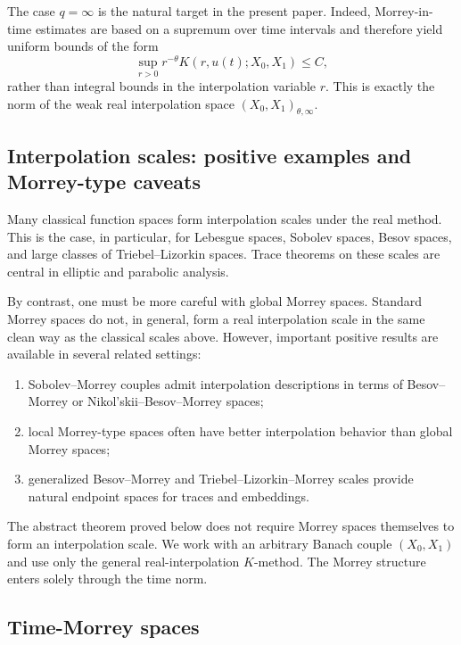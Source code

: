 \documentclass[smallextended,envcountsect,envcountsame]{svjour3}
\begin{document}
	\begin{remark}\label{rem:index-infinity}
		The case $q=\infty$ is the natural target in the present paper. Indeed, Morrey-in-time estimates are based on a supremum over time intervals and therefore yield uniform bounds of the form
		\[
		\sup_{r>0} r^{-\theta}K(r,u(t);X_0,X_1)\le C,
		\]
		rather than integral bounds in the interpolation variable $r$. This is exactly the norm of the weak real interpolation space $(X_0,X_1)_{\theta,\infty}$.
	\end{remark}
	
	\subsection{Interpolation scales: positive examples and Morrey-type caveats}
	
	Many classical function spaces form interpolation scales under the real method. This is the case, in particular, for Lebesgue spaces, Sobolev spaces, Besov spaces, and large classes of Triebel--Lizorkin spaces. Trace theorems on these scales are central in elliptic and parabolic analysis.
	
	By contrast, one must be more careful with global Morrey spaces. Standard Morrey spaces do not, in general, form a real interpolation scale in the same clean way as the classical scales above. However, important positive results are available in several related settings:
	\begin{enumerate}[label=\textup{(\roman*)}]
		\item Sobolev--Morrey couples admit interpolation descriptions in terms of Besov--Morrey or Nikol'skii--Besov--Morrey spaces;
		\item local Morrey-type spaces often have better interpolation behavior than global Morrey spaces;
		\item generalized Besov--Morrey and Triebel--Lizorkin--Morrey scales provide natural endpoint spaces for traces and embeddings.
	\end{enumerate}
	
	\begin{remark}\label{rem:morrey-scale-caveat}
		The abstract theorem proved below does not require Morrey spaces themselves to form an interpolation scale. We work with an arbitrary Banach couple $(X_0,X_1)$ and use only the general real-interpolation $K$-method. The Morrey structure enters solely through the time norm.
	\end{remark}
	
	\subsection{Time-Morrey spaces}
	
\end{document}
